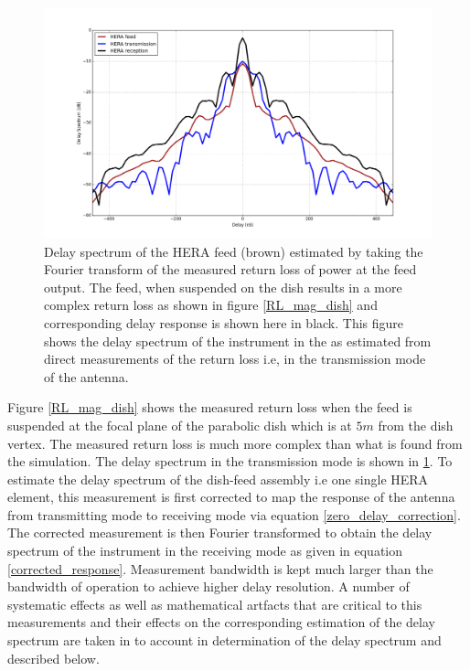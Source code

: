 \documentclass[twocolumn]{emulateapj}
\begin{document}
\begin{figure}       
\centering
\includegraphics[width=\linewidth]{GB_reflectometry_part3/plot/ds_feed_on_dish_trans_recp.png}
\caption{Delay spectrum of the HERA feed (brown) estimated by taking the Fourier transform of the measured return loss of power at the feed output. The feed, when suspended on the dish results in a more complex return loss as shown in figure \ref{RL_mag_dish} and corresponding delay response is shown here in black. This figure shows the delay spectrum of the instrument in the as estimated from direct measurements of the return loss i.e, in the transmission mode of the antenna. }
\label{ds_feed_on_dish_trans}
\end{figure}

Figure \ref{RL_mag_dish} shows the measured return loss when the feed is suspended at the focal plane of the parabolic dish which is at $5m$ from the dish vertex. The measured return loss is much more complex than what is found from the simulation. The delay spectrum in the transmission mode is shown in \ref{ds_feed_on_dish_trans}. To estimate the delay spectrum of the dish-feed assembly i.e one single HERA element, this measurement is first corrected to map the response of the antenna from transmitting mode to receiving mode via equation \ref{zero_delay_correction}. The corrected measurement is then Fourier transformed to obtain the delay spectrum of the instrument in the receiving mode as given in equation \ref{corrected_response}. Measurement bandwidth is kept much larger than the bandwidth of operation to achieve higher delay resolution. A number of systematic effects as well as mathematical artfacts that are critical to this measurements and their effects on the corresponding estimation of the delay spectrum are taken in to account in determination of the delay spectrum and described below. 
\end{document}
